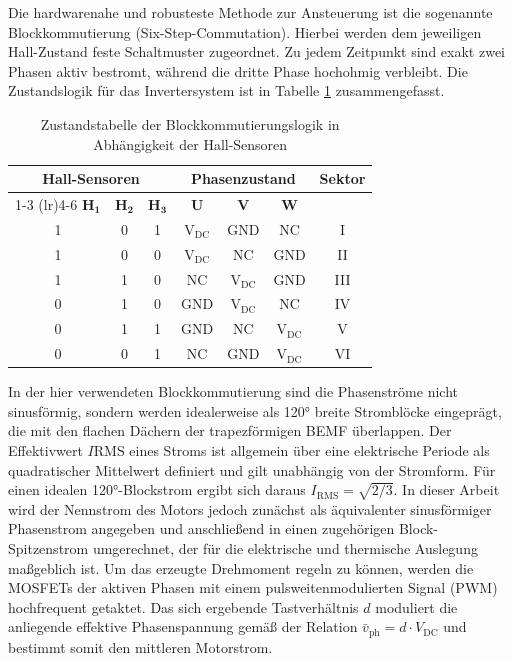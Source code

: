 Die hardwarenahe und robusteste Methode zur Ansteuerung ist die sogenannte Blockkommutierung (Six-Step-Commutation). Hierbei werden dem jeweiligen Hall-Zustand feste Schaltmuster zugeordnet. Zu jedem Zeitpunkt sind exakt zwei Phasen aktiv bestromt, während die dritte Phase hochohmig verbleibt. Die Zustandslogik für das Invertersystem ist in Tabelle \ref{tab:kommutierung} zusammengefasst.

\begin{table}[htbp]
    \centering
    \caption{Zustandstabelle der Blockkommutierungslogik in Abhängigkeit der Hall-Sensoren}
    \label{tab:kommutierung}
    \begin{tabular}{ccc ccc c}
        \toprule
        \multicolumn{3}{c}{\textbf{Hall-Sensoren}} & 
        \multicolumn{3}{c}{\textbf{Phasenzustand}} & 
        \textbf{Sektor} \\
        \cmidrule(lr){1-3} \cmidrule(lr){4-6}
        $\mathbf{H_1}$ & $\mathbf{H_2}$ & $\mathbf{H_3}$ & $\mathbf{U}$ & $\mathbf{V}$ & $\mathbf{W}$ & \\
        \midrule
        1 & 0 & 1 & $\mathrm{V_{DC}}$ & GND & NC & I \\
        1 & 0 & 0 & $\mathrm{V_{DC}}$ & NC & GND & II \\
        1 & 1 & 0 & NC & $\mathrm{V_{DC}}$ & GND & III \\
        0 & 1 & 0 & GND & $\mathrm{V_{DC}}$ & NC & IV \\
        0 & 1 & 1 & GND & NC & $\mathrm{V_{DC}}$ & V \\
        0 & 0 & 1 & NC & GND & $\mathrm{V_{DC}}$ & VI \\
        \bottomrule
    \end{tabular}
\end{table}

In der hier verwendeten Blockkommutierung sind die Phasenströme nicht sinusförmig, sondern werden idealerweise als 120° breite Stromblöcke eingeprägt, die mit den flachen Dächern der trapezförmigen BEMF überlappen. Der Effektivwert \(I\text{RMS}\) eines Stroms ist allgemein über eine elektrische Periode als quadratischer Mittelwert definiert und gilt unabhängig von der Stromform. Für einen idealen 120°-Blockstrom ergibt sich daraus $I_\mathrm{RMS}=\sqrt{2/3}$. In dieser Arbeit wird der Nennstrom des Motors jedoch zunächst als äquivalenter sinusförmiger Phasenstrom angegeben und anschließend in einen zugehörigen Block-Spitzenstrom umgerechnet, der für die elektrische und thermische Auslegung maßgeblich ist. Um das erzeugte Drehmoment regeln zu können, werden die MOSFETs der aktiven Phasen mit einem pulsweitenmodulierten Signal (PWM) hochfrequent getaktet. Das sich ergebende Tastverhältnis $d$ moduliert die anliegende effektive Phasenspannung gemäß der Relation $\bar{v}_{\mathrm{ph}} = d \cdot V_{\mathrm{DC}}$ und bestimmt somit den mittleren Motorstrom.

